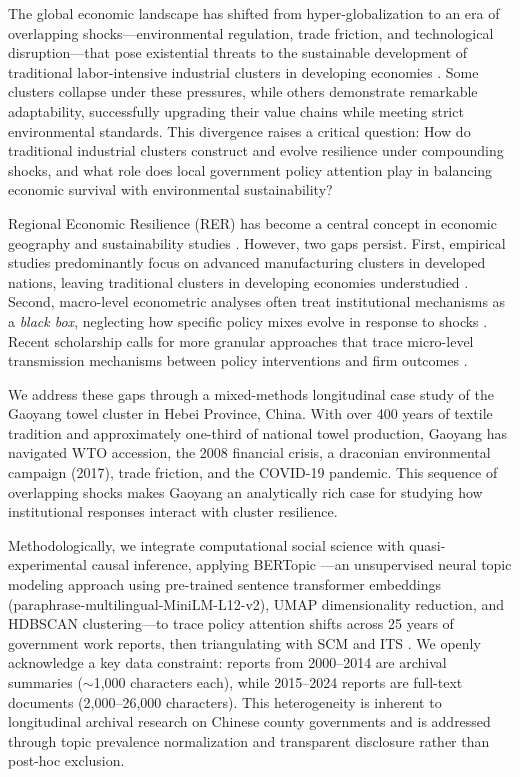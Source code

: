 \documentclass[a4paper, twoside, final]{article}
\begin{document}
The global economic landscape has shifted from hyper-globalization to an era of overlapping shocks---environmental regulation, trade friction, and technological disruption---that pose existential threats to the sustainable development of traditional labor-intensive industrial clusters in developing economies \citep{Gong2022, Zhou2017}. Some clusters collapse under these pressures, while others demonstrate remarkable adaptability, successfully upgrading their value chains while meeting strict environmental standards. This divergence raises a critical question: How do traditional industrial clusters construct and evolve resilience under compounding shocks, and what role does local government policy attention play in balancing economic survival with environmental sustainability?

Regional Economic Resilience (RER) has become a central concept in economic geography and sustainability studies \citep{Martin2012, Boschma2015, Martin2015}. However, two gaps persist. First, empirical studies predominantly focus on advanced manufacturing clusters in developed nations, leaving traditional clusters in developing economies understudied \citep{Zhu2022}. Second, macro-level econometric analyses often treat institutional mechanisms as a \emph{black box}, neglecting how specific policy mixes evolve in response to shocks \citep{Grillitsch2020, Hassink2019}. Recent scholarship calls for more granular approaches that trace micro-level transmission mechanisms between policy interventions and firm outcomes \citep{RodriguezPose2013, HuHassink2017}.

We address these gaps through a mixed-methods longitudinal case study \citep{Creswell2017} of the Gaoyang towel cluster in Hebei Province, China. With over 400 years of textile tradition and approximately one-third of national towel production, Gaoyang has navigated WTO accession, the 2008 financial crisis, a draconian environmental campaign (2017), trade friction, and the COVID-19 pandemic. This sequence of overlapping shocks makes Gaoyang an analytically rich case for studying how institutional responses interact with cluster resilience.

Methodologically, we integrate computational social science with quasi-experimental causal inference, applying BERTopic \citep{Grootendorst2022}---an unsupervised neural topic modeling approach using pre-trained sentence transformer embeddings (paraphrase-multilingual-MiniLM-L12-v2), UMAP dimensionality reduction, and HDBSCAN clustering---to trace policy attention shifts across 25 years of government work reports, then triangulating with SCM \citep{Abadie2010} and ITS \citep{Bernal2017}. We openly acknowledge a key data constraint: reports from 2000--2014 are archival summaries ($\sim$1,000 characters each), while 2015--2024 reports are full-text documents (2,000--26,000 characters). This heterogeneity is inherent to longitudinal archival research on Chinese county governments and is addressed through topic prevalence normalization and transparent disclosure rather than post-hoc exclusion.
\end{document}

